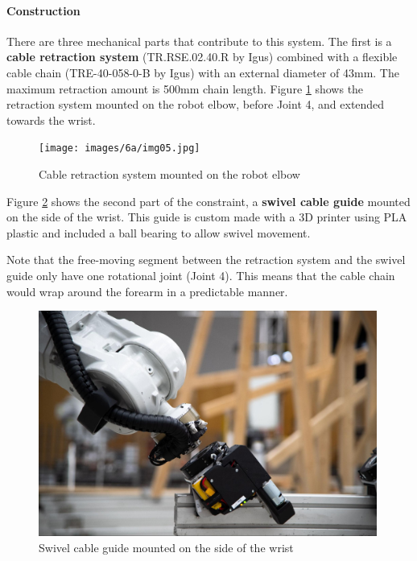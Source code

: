 \paragraph{Construction}

There are three mechanical parts that contribute to this system. The first is a \textbf{cable retraction system} (TR.RSE.02.40.R by Igus) combined with a flexible cable chain (TRE-40-058-0-B by Igus) with an external diameter of 43mm. The maximum retraction amount is 500mm chain length. Figure \ref{fig:cable-retraction-system} shows the retraction system mounted on the robot elbow, before Joint 4, and extended towards the wrist.

\begin{figure}[!h]
    \centering
    \texttt{[image: images/6a/img05.jpg]}
    \caption{Cable retraction system mounted on the robot elbow}
    \label{fig:cable-retraction-system}
\end{figure}

Figure \ref{fig:swivel-cable-guide} shows the second part of the constraint, a \textbf{swivel cable guide} mounted on the side of the wrist. This guide is custom made with a 3D printer using PLA plastic and included a ball bearing to allow swivel movement.

Note that the free-moving segment between the retraction system and the swivel guide only have one rotational joint (Joint 4). This means that the cable chain would wrap around the forearm in a predictable manner.

\begin{figure}[!h]
    \centering
    \includegraphics[width=0.99\textwidth]{images/6a/img06.jpg}
    \caption{Swivel cable guide mounted on the side of the wrist}
    \label{fig:swivel-cable-guide}
\end{figure}

